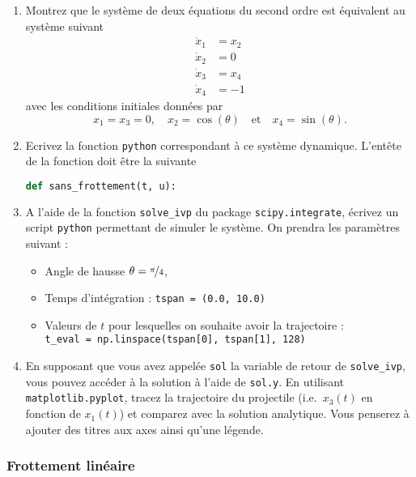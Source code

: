 \documentclass[a4paper,12pt]{article} %
\begin{document}
\begin{enumerate}
\item Montrez que le système de deux équations du second ordre est équivalent au système suivant
  \[
  \begin{aligned}
    \dot{x}_1 & = x_2 \\
    \dot{x}_2 & = 0 \\
    \dot{x}_3 & = x_4 \\
    \dot{x}_4 & = -1
  \end{aligned}
  \]
  avec les conditions initiales données par
  \[
  x_1 = x_3 = 0, \quad x_2 = \cos(\theta) \quad \text{et} \quad x_4 = \sin(\theta).
  \]

\item Ecrivez la fonction \verb+python+ correspondant à ce système dynamique.
  L'entête de la fonction doit être la suivante
  \begin{lstlisting}[language=Python]
    def sans_frottement(t, u):
  \end{lstlisting}

\item A l'aide de la fonction \verb+solve_ivp+ du package \verb+scipy.integrate+, écrivez un script \verb+python+ permettant de simuler le système.
  On prendra les paramètres suivant :
  \begin{itemize}
  \item Angle de hausse $\theta = \nicefrac{\pi}{4}$,
  \item Temps d'intégration : \verb+tspan = (0.0, 10.0)+
  \item Valeurs de $t$ pour lesquelles on souhaite avoir la trajectoire : \\\verb+t_eval = np.linspace(tspan[0], tspan[1], 128)+
  \end{itemize}

\item En supposant que vous avez appelée \verb+sol+ la variable de retour de \verb+solve_ivp+, vous pouvez accéder à la solution à l'aide de \verb+sol.y+.
  En utilisant \verb+matplotlib.pyplot+, tracez la trajectoire du projectile (i.e.\ $x_3(t)$ en fonction de $x_1(t)$) et comparez avec la solution analytique.
  Vous penserez à ajouter des titres aux axes ainsi qu'une légende.
\end{enumerate}

\subsubsection*{Frottement linéaire}
\end{document}
